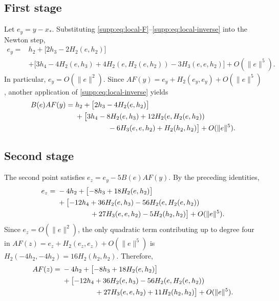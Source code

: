 \documentclass[11pt,a4paper]{article}
\numberwithin{equation}{section}
\numberwithin{table}{section}
\theoremstyle{plain}
\theoremstyle{definition}\newtheorem{definition}[theorem]{Definition}
\theoremstyle{remark}\newtheorem{remark}[theorem]{Remark}
\begin{document}
\subsection{First stage}
Let $e_y=y-x_*$. Substituting
\eqref{supp:eq:local-F}--\eqref{supp:eq:local-inverse} into the Newton
step,
\begin{equation}
 \begin{aligned}
 e_y={}&h_2+\bigl[2h_3-2H_2(e,h_2)\bigr]\\
 &+\bigl[3h_4-4H_2(e,h_3)+4H_2(e,H_2(e,h_2))-3H_3(e,e,h_2)\bigr]
 +O(\|e\|^5).
 \end{aligned}\label{supp:eq:local-y}
\end{equation}
In particular, $e_y=O(\|e\|^2)$. Since
$AF(y)=e_y+H_2(e_y,e_y)+O(\|e\|^5)$, another application of
\eqref{supp:eq:local-inverse} yields
\begin{equation}
 \begin{aligned}
 B(e)AF(y)={}&h_2+\bigl[2h_3-4H_2(e,h_2)\bigr]\\
 &+\bigl[3h_4-8H_2(e,h_3)+12H_2(e,H_2(e,h_2))\\
 &\hspace{16mm}-6H_3(e,e,h_2)+H_2(h_2,h_2)\bigr]+O(\|e\|^5).
 \end{aligned}\label{supp:eq:local-correction-y}
\end{equation}

\subsection{Second stage}
The second point satisfies $e_z=e_y-5B(e)AF(y)$. By the preceding
identities,
\begin{equation}
 \begin{aligned}
 e_z={}&-4h_2+\bigl[-8h_3+18H_2(e,h_2)\bigr]\\
 &+\bigl[-12h_4+36H_2(e,h_3)-56H_2(e,H_2(e,h_2))\\
 &\hspace{16mm}+27H_3(e,e,h_2)-5H_2(h_2,h_2)\bigr]+O(\|e\|^5).
 \end{aligned}\label{supp:eq:local-z}
\end{equation}
Since $e_z=O(\|e\|^2)$, the only quadratic term contributing up to
degree four in $AF(z)=e_z+H_2(e_z,e_z)+O(\|e\|^5)$ is
$H_2(-4h_2,-4h_2)=16H_2(h_2,h_2)$. Therefore,
\begin{equation}
 \begin{aligned}
 AF(z)={}&-4h_2+\bigl[-8h_3+18H_2(e,h_2)\bigr]\\
 &+\bigl[-12h_4+36H_2(e,h_3)-56H_2(e,H_2(e,h_2))\\
 &\hspace{16mm}+27H_3(e,e,h_2)+11H_2(h_2,h_2)\bigr]+O(\|e\|^5).
 \end{aligned}\label{supp:eq:local-Fz}
\end{equation}
\end{document}

